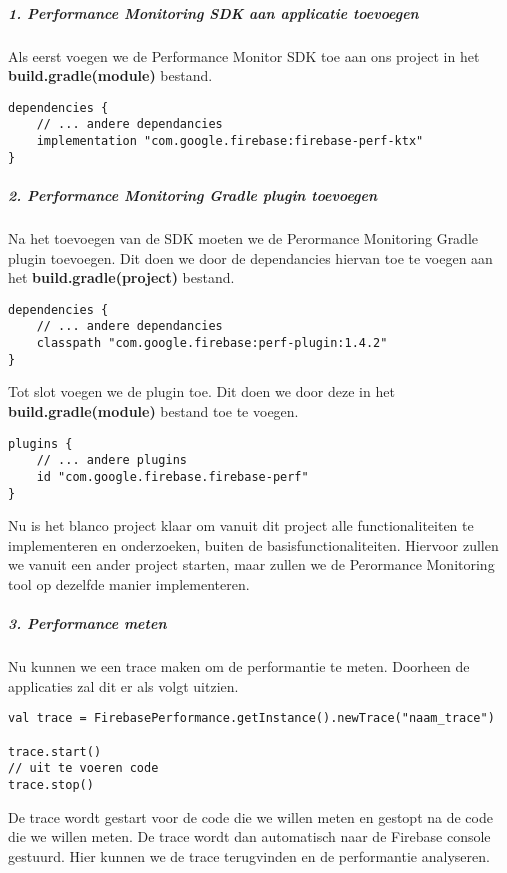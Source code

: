 \subparagraph{1. Performance Monitoring SDK aan applicatie toevoegen}
Als eerst voegen we de Performance Monitor SDK toe aan ons project in het \textbf{build.gradle(module)} bestand.
\begin{verbatim}
dependencies {
    // ... andere dependancies
    implementation "com.google.firebase:firebase-perf-ktx"
}
\end{verbatim}

\subparagraph{2. Performance Monitoring Gradle plugin toevoegen}
Na het toevoegen van de SDK moeten we de Perormance Monitoring Gradle plugin toevoegen. 
Dit doen we door de dependancies hiervan toe te voegen aan het \textbf{build.gradle(project)} bestand.
\begin{verbatim}
dependencies {
    // ... andere dependancies
    classpath "com.google.firebase:perf-plugin:1.4.2"
}
\end{verbatim}
Tot slot voegen we de plugin toe. Dit doen we door deze in het \textbf{build.gradle(module)} bestand toe te voegen.
\begin{verbatim}
plugins {
    // ... andere plugins
    id "com.google.firebase.firebase-perf"
}
\end{verbatim}
Nu is het blanco project klaar om vanuit dit project alle functionaliteiten te 
implementeren en onderzoeken, buiten de basisfunctionaliteiten. Hiervoor zullen we vanuit een ander project starten, 
maar zullen we de Perormance Monitoring tool op dezelfde manier implementeren.

\subparagraph{3. Performance meten}
Nu kunnen we een trace maken om de performantie te meten. Doorheen de applicaties zal dit er als 
volgt uitzien.
\begin{verbatim}
val trace = FirebasePerformance.getInstance().newTrace("naam_trace")

trace.start()
// uit te voeren code
trace.stop()
\end{verbatim}
De trace wordt gestart voor de code die we willen meten en gestopt na de code die we willen meten.
De trace wordt dan automatisch naar de Firebase console gestuurd. Hier kunnen we de trace terugvinden
en de performantie analyseren.